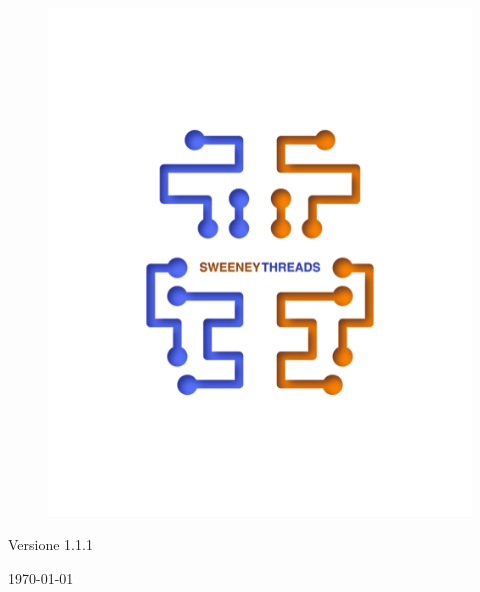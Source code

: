 \documentclass[a4paper]{report}
\begin{document}
\begin{titlepage}
		\begin{figure}[H]
			\centering
			\includegraphics[scale=0.8]{sweeney.png}
		\end{figure}
		\begin{center}
			Versione 1.1.1
		\end{center}
		{\large \today}\\[3cm] 
		\vfill  
	\end{titlepage}
	
	
	\tableofcontents
	
\end{document}
